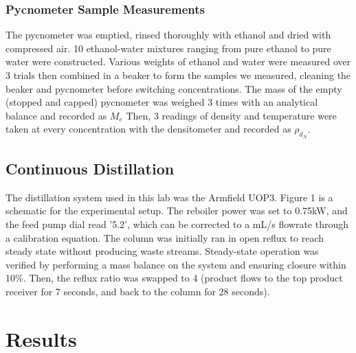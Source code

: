 \documentclass[lettersize,journal]{IEEEtran}
\begin{document}
	\subsubsection{Pycnometer Sample Measurements}
	The pycnometer was emptied, rinsed thoroughly with ethanol and dried with compressed air. 10 ethanol-water mixtures ranging from pure ethanol to pure water were constructed. Various weights of ethanol and water were measured over 3 trials then combined in a beaker to form the samples we measured, cleaning the beaker and pycnometer before switching concentrations. The mass of the empty (stopped and capped) pycnometer was weighed 3 times with an analytical balance and recorded as $M_{e}$ Then, 3 readings of density and temperature were taken at every concentration with the densitometer and recorded as $\rho_{d_N}$.
	\subsection{Continuous Distillation}
	The distillation system used in this lab was the Armfield UOP3. Figure 1 is a schematic for the experimental setup. The reboiler power was set to 0.75kW, and the feed pump dial read '5.2', which can be corrected to a mL/s flowrate through a calibration equation. The column was initially ran in open reflux to reach steady state without producing waste streams. Steady-state operation was verified by performing a mass balance on the system and ensuring closure within 10\%.  Then, the reflux ratio was swapped to 4 (product flows to the top product receiver for 7 seconds, and back to the column for 28 seconds). 
	\section{Results}
	
\end{document}
